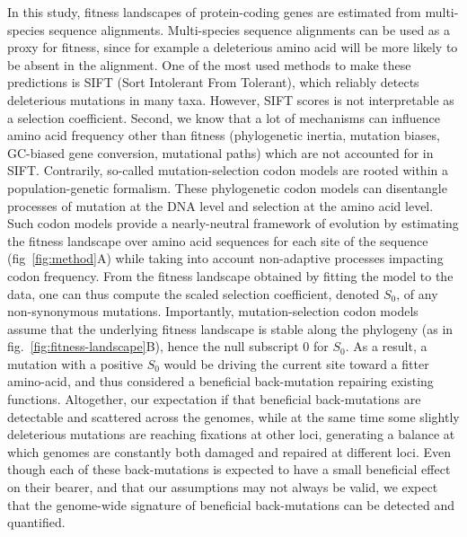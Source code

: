 \documentclass{article}
\newcommand{\Sphy}{S_{0}}
\begin{document}
    In this study, fitness landscapes of protein-coding genes are estimated from multi-species sequence alignments.
    Multi-species sequence alignments can be used as a proxy for fitness, since for example a deleterious amino acid will be more likely to be absent in the alignment.
    One of the most used methods to make these predictions is SIFT (Sort Intolerant From Tolerant), which reliably detects deleterious mutations in many taxa\cite{ng_sift_2003, vaser_sift_2016}.
    However, SIFT scores is not interpretable as a selection coefficient.
    Second, we know that a lot of mechanisms can influence amino acid frequency other than fitness (phylogenetic inertia, mutation biases, GC-biased gene conversion, mutational paths) which are not accounted for in SIFT\@.
    Contrarily, so-called mutation-selection codon models are rooted within a population-genetic formalism\cite{halpern_evolutionary_1998, mccandlish_modeling_2014}.
    These phylogenetic codon models can disentangle processes of mutation at the DNA level and selection at the amino acid level.
    Such codon models provide a nearly-neutral framework of evolution by estimating the fitness landscape over amino acid sequences for each site of the sequence (fig~\ref{fig:method}A) while taking into account non-adaptive processes impacting codon frequency\cite{halpern_evolutionary_1998, rodrigue_mechanistic_2010, tamuri_estimating_2012, latrille_improved_2022a}.
    From the fitness landscape obtained by fitting the model to the data, one can thus compute the scaled selection coefficient, denoted $\Sphy$, of any non-synonymous mutations.
    Importantly, mutation-selection codon models assume that the underlying fitness landscape is stable along the phylogeny (as in fig.~\ref{fig:fitness-landscape}B), hence the null subscript $0$ for $\Sphy$.
    As a result, a mutation with a positive $\Sphy$ would be driving the current site toward a fitter amino-acid, and thus considered a beneficial back-mutation repairing existing functions.
    Altogether, our expectation if that beneficial back-mutations are detectable and scattered across the genomes, while at the same time some slightly deleterious mutations are reaching fixations at other loci, generating a balance at which genomes are constantly both damaged and repaired at different loci.
    Even though each of these back-mutations is expected to have a small beneficial effect on their bearer, and that our assumptions may not always be valid, we expect that the genome-wide signature of beneficial back-mutations can be detected and quantified.
\end{document}
